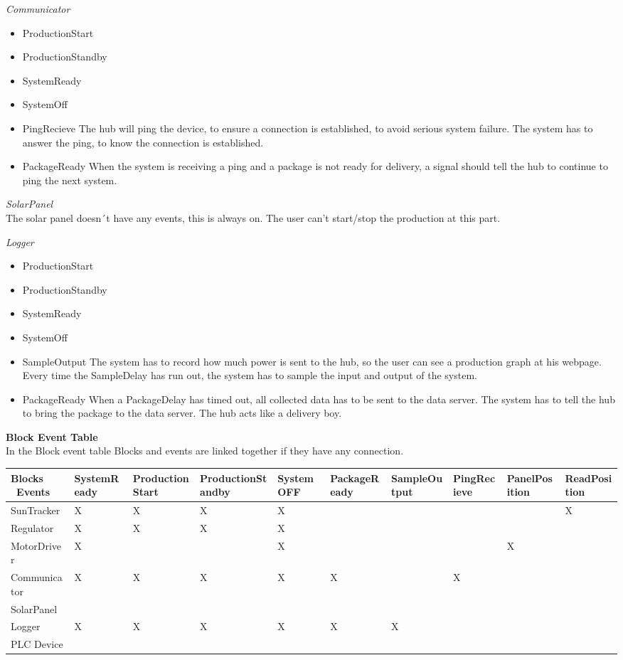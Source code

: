 \documentclass[12pt,a4paper]{report}
\begin{document}
\textit{Communicator}
\begin{itemize}
\item ProductionStart
\item ProductionStandby
\item SystemReady
\item SystemOff
\item PingRecieve
The hub will ping the device, to ensure a connection is established, to avoid serious system failure. The system has to answer the ping, to know the connection is established. 
\item PackageReady
When the system is receiving a ping and a package is not ready for delivery, a signal should tell the hub to continue to ping the next system.
\end{itemize}


\textit{SolarPanel}\\
The solar panel doesn´t have any events, this is always on. The user can’t start/stop the production at this part.



\textit{Logger}
\begin{itemize}
\item ProductionStart
\item ProductionStandby
\item SystemReady
\item SystemOff
\item SampleOutput
The system has to record how much power is sent to the hub, so the user can see a production graph at his webpage. Every time the SampleDelay has run out, the system has to sample the input and output of the system.
\item PackageReady
When a PackageDelay has timed out, all collected data has to be sent to the data server. The system has to tell the hub to bring the package to the data server. The hub acts like a delivery boy.
\end{itemize}

\textbf{Block Event Table}\\
In the Block event table Blocks and events are linked together if they have any connection.

\begin{tabular}{|l|l|l|l|l|l|l|l|l|l|}
\hline Blocks \ Events & SystemReady & ProductionStart & ProductionStandby & SystemOFF & PackageReady & SampleOutput & PingRecieve & PanelPosition & ReadPosition \\ 
\hline SunTracker & X & X & X & X  &  &  &  &  &  X \\ 
\hline Regulator & X & X & X & X  &  &  &  &  &  \\ 
\hline MotorDriver & X  &  &  &  X  &  &  &  &  X  & \\ 
\hline Communicator & X & X & X & X & X  &  &  X  &  &  \\ 
\hline SolarPanel &  &  &  &  &  &  &  &  &  \\ 
\hline Logger & X & X & X & X & X & X  &  &  &  \\ 
\hline PLC Device &  &  &  &  &  &  &  &  &  \\ 
\hline 
\end{tabular} 
\end{document}
